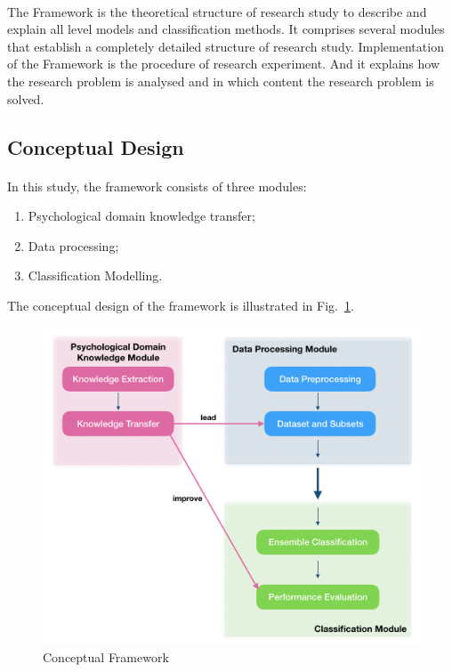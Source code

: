 \documentclass[runningheads]{llncs}
\begin{document}
\paragraph{}
The Framework is the theoretical structure of research study to describe and explain all level models and classification methods. It comprises several modules that establish a completely detailed structure of research study. Implementation of the Framework is the procedure of research experiment. And it explains how the research problem is analysed and in which content the research problem is solved. 
%
\subsection{Conceptual Design}
%
\paragraph{}
In this study, the framework consists of three modules:
\begin{enumerate}
  \item Psychological domain knowledge transfer;
  \item Data processing;
  \item Classification Modelling.
\end{enumerate}
The conceptual design of the framework is illustrated in Fig.~\ref{fig1}.
\begin{figure}[h]
\includegraphics[width=1\textwidth]{concepts.png}
\caption{Conceptual Framework} \label{fig1}
\end{figure}
\end{document}
